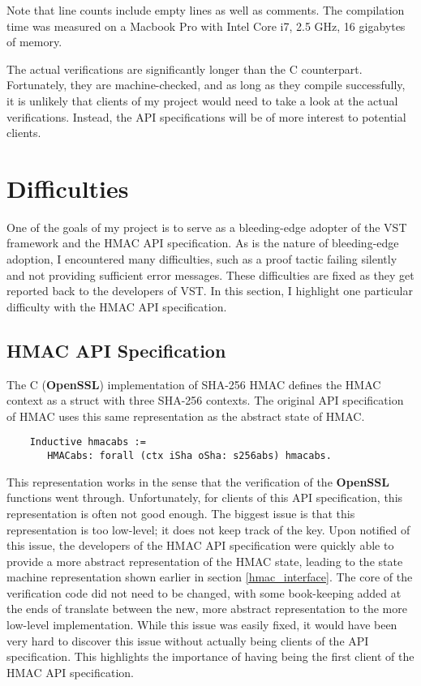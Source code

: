 \documentclass[pageno]{jpaper}
\newcommand{\stdtitle}[1]{\textbf{#1}}
\begin{document}
Note that line counts include empty lines as well as comments. The compilation time was measured on a Macbook Pro with Intel Core i7, 2.5 GHz, 16 gigabytes of memory.

The actual verifications are significantly longer than the C counterpart. Fortunately, they are machine-checked, and as long as they compile successfully, it is unlikely that clients of my project would need to take a look at the actual verifications. Instead, the API specifications will be of more interest to potential clients.

\section{Difficulties}

One of the goals of my project is to serve as a bleeding-edge adopter of the VST framework and the HMAC API specification. As is the nature of bleeding-edge adoption, I encountered many difficulties, such as a proof tactic failing silently and not providing sufficient error messages. These difficulties are fixed as they get reported back to the developers of VST. In this section, I highlight one particular difficulty with the HMAC API specification.


\subsection{HMAC API Specification}

The C (\stdtitle{OpenSSL}) implementation of SHA-256 HMAC defines the HMAC context as a struct with three SHA-256 contexts. The original API specification of HMAC \cite{hmac} uses this same representation as the abstract state of HMAC.

\begin{lstlisting}
    Inductive hmacabs :=
       HMACabs: forall (ctx iSha oSha: s256abs) hmacabs.
\end{lstlisting}

This representation works in the sense that the verification of the \stdtitle{OpenSSL} functions went through. Unfortunately, for clients of this API specification, this representation is often not good enough. The biggest issue is that this representation is too low-level; it does not keep track of the key. Upon notified of this issue, the developers of the HMAC API specification were quickly able to provide a more abstract representation of the HMAC state, leading to the state machine representation shown earlier in section \ref{hmac_interface}. The core of the verification code did not need to be changed, with some book-keeping added at the ends of translate between the new, more abstract representation to the more low-level implementation. While this issue was easily fixed, it would have been very hard to discover this issue without actually being clients of the API specification. This highlights the importance of having being the first client of the HMAC API specification.
\end{document}
